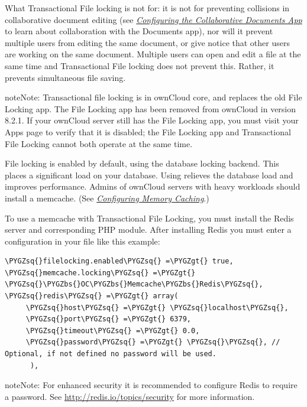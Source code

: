 \documentclass[letterpaper,10pt,english]{sphinxmanual}
\def\PYGZbs{\char`\\}
\def\PYGZgt{\char`\>}
\def\PYGZsq{\char`\'}
\begin{document}
What Transactional File locking is not for: it is not for preventing collisions
in collaborative document editing (see
{\hyperref[configuration_files/collaborative_documents_configuration::doc]{\emph{Configuring the Collaborative Documents App}}} to learn about collaboration with
the Documents app), nor will it prevent multiple users from editing the same
document, or give notice that other users are working on the same document.
Multiple users can open and edit a file at the same time and Transactional File
locking does not prevent this. Rather, it prevents simultaneous file saving.

\begin{notice}{note}{Note:}
Transactional file locking is in ownCloud core, and replaces the old
File Locking app. The File Locking app has been removed from ownCloud in
version 8.2.1. If your ownCloud server still has the File Locking app, you
must visit your Apps page to verify that it is disabled; the File Locking
app and Transactional File Locking cannot both operate at the same time.
\end{notice}

File locking is enabled by default, using the database locking backend. This
places a significant load on your database. Using  relieves
the database load and improves performance. Admins of ownCloud servers with
heavy workloads should install a memcache. (See
{\hyperref[configuration_server/caching_configuration::doc]{\emph{Configuring Memory Caching}}}.)

To use a memcache with Transactional File Locking, you must install the Redis
server and corresponding PHP module. After installing Redis you must enter a
configuration in your  file like this example:

\begin{Verbatim}[commandchars=\\\{\}]
\PYGZsq{}filelocking.enabled\PYGZsq{} =\PYGZgt{} true,
\PYGZsq{}memcache.locking\PYGZsq{} =\PYGZgt{} \PYGZsq{}\PYGZbs{}OC\PYGZbs{}Memcache\PYGZbs{}Redis\PYGZsq{},
\PYGZsq{}redis\PYGZsq{} =\PYGZgt{} array(
     \PYGZsq{}host\PYGZsq{} =\PYGZgt{} \PYGZsq{}localhost\PYGZsq{},
     \PYGZsq{}port\PYGZsq{} =\PYGZgt{} 6379,
     \PYGZsq{}timeout\PYGZsq{} =\PYGZgt{} 0.0,
     \PYGZsq{}password\PYGZsq{} =\PYGZgt{} \PYGZsq{}\PYGZsq{}, // Optional, if not defined no password will be used.
      ),
\end{Verbatim}

\begin{notice}{note}{Note:}
For enhanced security it is recommended to configure Redis to require
a password. See \href{http://redis.io/topics/security}{http://redis.io/topics/security} for more information.
\end{notice}
\end{document}
